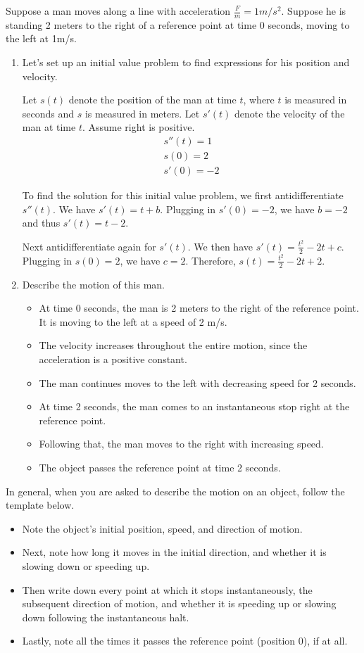 \documentclass[12pt,twoside]{article}
\begin{document}
Suppose a man moves along a line with acceleration $\frac{F}{m} = 1 m/s^2$. Suppose he is standing 2 meters to the right of a reference point at time 0 seconds, moving to the left at 1m/s. 

\begin{enumerate}
\item Let's set up an initial value problem to find expressions for his position and velocity. 

Let $s(t)$ denote the position of the man at time $t$, where $t$ is measured in seconds and $s$ is measured in meters. Let $s'(t)$ denote the velocity of the man at time $t$. Assume right is positive. 
\begin{align*}
s''(t) = 1 \\
s(0) = 2 \\
s'(0) = -2
\end{align*}

To find the solution for this initial value problem, we first antidifferentiate $s''(t)$. We have $s'(t) = t + b$. Plugging in $s'(0) = -2$, we have $b = -2$ and thus $s'(t) = t-2$. 

Next antidifferentiate again for $s'(t)$. We then have $s'(t) = \frac{t^2}{2} -2t +c$. Plugging in $s(0) = 2$, we have $c = 2$. Therefore, $s(t) =  \frac{t^2}{2} -2t +2$. 

\item Describe the motion of this man. 
\begin{itemize}
\item At time 0 seconds, the man is 2 meters to the right of the reference point. It is moving to the left at a speed of 2 m/s. 
\item The velocity increases throughout the entire motion, since the acceleration is a positive constant. 
\item The man continues moves to the left with decreasing speed for 2 seconds. 
\item At time 2 seconds, the man comes to an instantaneous stop right at the reference point. 
\item Following that, the man moves to the right with increasing speed. 
\item The object passes the reference point at time 2 seconds. 
\end{itemize}
\end{enumerate}

In general, when you are asked to describe the motion on an object, follow the template below. 
\begin{itemize}
 \item Note the object's initial position, speed, and direction of motion.
 \item Next, note how long it moves in the initial direction, and whether it is slowing down or speeding up.
 \item Then write down every point at which it stops instantaneously, the subsequent direction of motion, and whether it is speeding up or slowing down following the instantaneous halt.
 \item Lastly, note all the times it passes the reference point (position 0), if at all.
\end{itemize}
\end{document}
